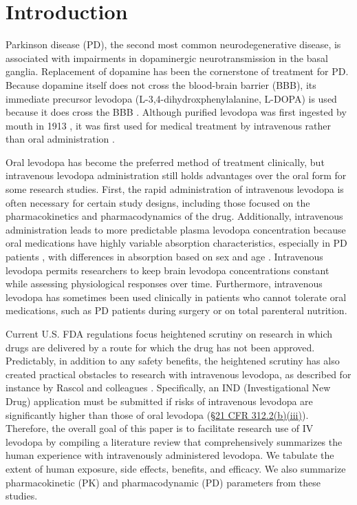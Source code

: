 \section{Introduction}
Parkinson disease (PD), the second most common neurodegenerative disease, is associated with impairments in dopaminergic neurotransmission in the basal ganglia. Replacement of dopamine has been the cornerstone of treatment for PD. Because dopamine itself does not cross the blood-brain barrier (BBB), its immediate precursor levodopa (L-3,4-dihydroxphenylalanine, L-DOPA) is used because it does cross the BBB \cite{11763859,13954967,5334614}. Although purified levodopa was first ingested by mouth in 1913 \cite{Roe_1997}, it was first used for medical treatment by intravenous rather than oral administration \cite{14430381,11763859}.
	
Oral levodopa has become the preferred method of treatment clinically, but intravenous levodopa administration still holds advantages over the oral form for some research studies.  First, the rapid administration of intravenous levodopa is often necessary for certain study designs, including those focused on the pharmacokinetics and pharmacodynamics of the drug.  Additionally, intravenous administration leads to more predictable plasma levodopa concentration because oral medications have highly variable absorption characteristics, especially in PD patients \cite{2797454}, with differences in absorption based on sex and age \cite{2775615,12011296}.  Intravenous levodopa permits researchers to keep brain levodopa concentrations constant while assessing physiological responses over time.  Furthermore, intravenous levodopa has sometimes been used clinically in patients who cannot tolerate oral medications, such as PD patients during surgery or on total parenteral nutrition.  

Current U.S. FDA regulations focus heightened scrutiny on research in which drugs are delivered by a route for which the drug has not been approved. Predictably, in addition to any safety benefits, the heightened scrutiny has also created practical obstacles to research with intravenous levodopa, as described for instance by Rascol and colleagues \citep[p. 250]{11176963}.  Specifically, an IND (Investigational New Drug) application must be submitted if risks of intravenous levodopa are significantly higher than those of oral levodopa (\href{http://www.accessdata.fda.gov/scripts/cdrh/cfdocs/cfcfr/CFRSearch.cfm?fr=312.2}{\S 21 CFR 312.2(b)(iii)}).  Therefore, the overall goal of this paper is to facilitate research use of IV levodopa by compiling a literature review that comprehensively summarizes the human experience with intravenously administered levodopa.  We tabulate the extent of human exposure, side effects, benefits, and efficacy.  We also summarize pharmacokinetic (PK) and pharmacodynamic (PD) parameters from these studies. 
